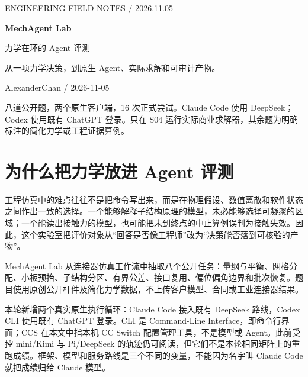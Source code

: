 \documentclass[11pt,a4paper]{ctexart}
\begin{document}
\thispagestyle{empty}

{\sffamily\color{Teal}ENGINEERING FIELD NOTES / 2026.11.05}\par\vspace{1em}

{\Huge\bfseries\color{Ink}MechAgent Lab}\par\vspace{.5em}

{\LARGE 力学在环的 Agent 评测}\par\vspace{1em}

从一项力学决策，到原生 Agent、实际求解和可审计产物。

\par AlexanderChan / 2026-11-05\par\vspace{1em}

八道公开题，两个原生客户端，16 次正式尝试。Claude Code 使用 DeepSeek；Codex 使用既有 ChatGPT 登录。只在 S04 运行实际商业求解器，其余题为明确标注的简化力学或工程证据算例。

\tableofcontents\newpage

\section{为什么把力学放进 Agent 评测}

工程仿真中的难点往往不是把命令写出来，而是在物理假设、数值离散和软件状态之间作出一致的选择。一个能够解释子结构原理的模型，未必能够选择可凝聚的区域；一个能读出接触力的模型，也可能把未到终点的中止算例误判为接触失效。因此，这个实验室把评价对象从“回答是否像工程师”改为“决策能否落到可核验的产物”。

\par

MechAgent Lab 从连接器仿真工作流中抽取八个公开任务：量纲与平衡、网格分配、小板预抬、子结构分区、有界公差、接口复用、偏位偏角边界和批次恢复。题目使用原创公开杆件及简化力学数据，不上传客户模型、合同或工业连接器结果。

\par

本轮新增两个真实原生执行循环：Claude Code 接入既有 DeepSeek 路线，Codex CLI 使用既有 ChatGPT 登录。CLI 是 Command-Line Interface，即命令行界面；CCS 在本文中指本机 CC Switch 配置管理工具，不是模型或 Agent。此前受控 mini/Kimi 与 Pi/DeepSeek 的轨迹仍可阅读，但它们不是本轮相同矩阵上的重跑成绩。框架、模型和服务路线是三个不同的变量，不能因为名字叫 Claude Code 就把成绩归给 Claude 模型。
\end{document}
